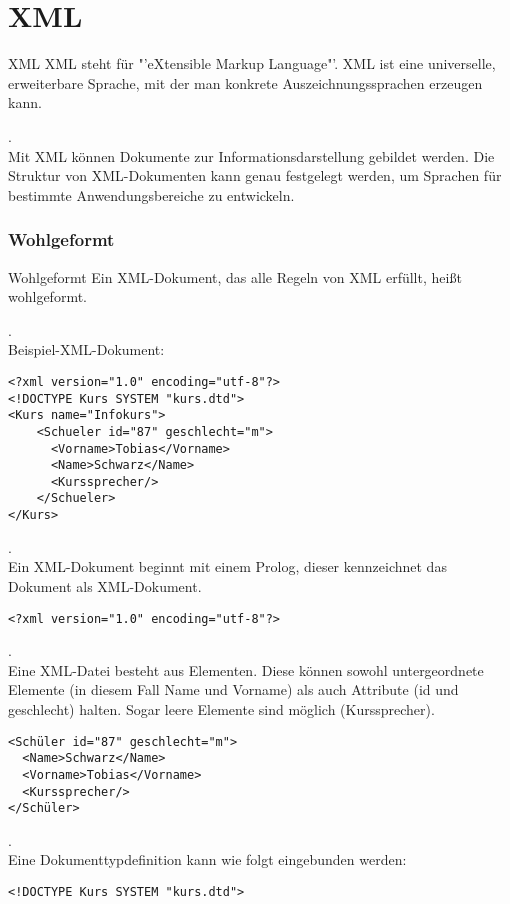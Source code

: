 \part{XML}
\begin{zitat}{XML}
XML steht für  "'eXtensible Markup Language"'. XML ist eine universelle, erweiterbare Sprache, mit der man konkrete Auszeichnungssprachen erzeugen kann.
\end{zitat}
.\\
Mit XML können Dokumente zur Informationsdarstellung gebildet werden.
Die Struktur von XML-Dokumenten kann genau festgelegt werden, um Sprachen für bestimmte Anwendungsbereiche zu entwickeln.
\section{Wohlgeformt}
\begin{zitat}{Wohlgeformt}
 Ein XML-Dokument, das alle Regeln von XML erfüllt, heißt wohlgeformt.
\end{zitat}
.\\
Beispiel-XML-Dokument:
\lstset{language=XML}
\begin{lstlisting}
<?xml version="1.0" encoding="utf-8"?>
<!DOCTYPE Kurs SYSTEM "kurs.dtd">
<Kurs name="Infokurs">
    <Schueler id="87" geschlecht="m">
      <Vorname>Tobias</Vorname>
      <Name>Schwarz</Name>
      <Kurssprecher/>
    </Schueler>
</Kurs>
\end{lstlisting}
.\\
Ein XML-Dokument beginnt mit einem Prolog, dieser kennzeichnet das Dokument als XML-Dokument.
\begin{lstlisting}
<?xml version="1.0" encoding="utf-8"?>
\end{lstlisting}
.\\
Eine XML-Datei besteht aus Elementen. Diese können sowohl untergeordnete Elemente (in diesem Fall Name und Vorname) als auch Attribute (id und geschlecht) halten. Sogar leere Elemente sind möglich (Kurssprecher).
\begin{lstlisting}
<Schüler id="87" geschlecht="m">
  <Name>Schwarz</Name>
  <Vorname>Tobias</Vorname>
  <Kurssprecher/>
</Schüler>
\end{lstlisting}
.\\
Eine Dokumenttypdefinition kann wie folgt eingebunden werden:
\begin{lstlisting}
<!DOCTYPE Kurs SYSTEM "kurs.dtd">
\end{lstlisting}
\newpage

